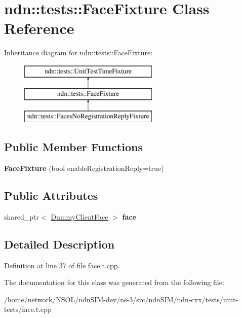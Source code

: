 \hypertarget{classndn_1_1tests_1_1FaceFixture}{}\section{ndn\+:\+:tests\+:\+:Face\+Fixture Class Reference}
\label{classndn_1_1tests_1_1FaceFixture}
Inheritance diagram for ndn\+:\+:tests\+:\+:Face\+Fixture\+:\begin{figure}[H]
\begin{center}
\leavevmode
\includegraphics[height=3.000000cm]{classndn_1_1tests_1_1FaceFixture}
\end{center}
\end{figure}
\subsection*{Public Member Functions}
\begin{DoxyCompactItemize}
\item 
{\bfseries Face\+Fixture} (bool enable\+Registration\+Reply=true)\hypertarget{classndn_1_1tests_1_1FaceFixture_adf4730fbd023a199893a0456b7a596f9}{}\label{classndn_1_1tests_1_1FaceFixture_adf4730fbd023a199893a0456b7a596f9}

\end{DoxyCompactItemize}
\subsection*{Public Attributes}
\begin{DoxyCompactItemize}
\item 
shared\+\_\+ptr$<$ \hyperlink{classndn_1_1util_1_1DummyClientFace}{Dummy\+Client\+Face} $>$ {\bfseries face}\hypertarget{classndn_1_1tests_1_1FaceFixture_adc2a300be9d75a5807a7920dde672ec0}{}\label{classndn_1_1tests_1_1FaceFixture_adc2a300be9d75a5807a7920dde672ec0}

\end{DoxyCompactItemize}


\subsection{Detailed Description}


Definition at line 37 of file face.\+t.\+cpp.



The documentation for this class was generated from the following file\+:\begin{DoxyCompactItemize}
\item 
/home/network/\+N\+S\+O\+L/ndn\+S\+I\+M-\/dev/ns-\/3/src/ndn\+S\+I\+M/ndn-\/cxx/tests/unit-\/tests/face.\+t.\+cpp\end{DoxyCompactItemize}
